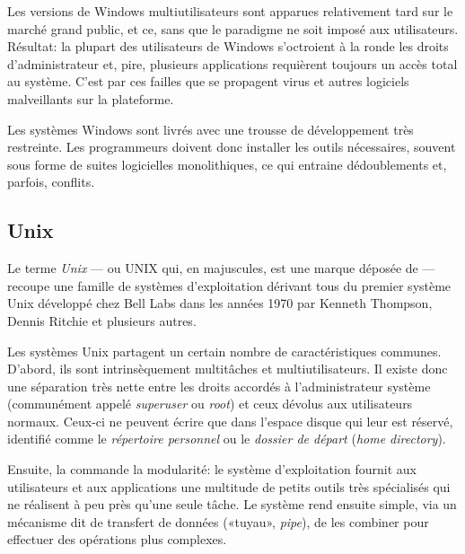 Les versions de Windows multiutilisateurs sont apparues relativement
tard sur le marché grand public, et ce, sans que le paradigme ne soit
imposé aux utilisateurs. Résultat: la plupart des utilisateurs de
Windows s'octroient à la ronde les droits d'administrateur et, pire,
plusieurs applications requièrent toujours un accès total au système.
C'est par ces failles que se propagent virus et autres logiciels
malveillants sur la plateforme.

Les systèmes Windows sont livrés avec une trousse de développement
très restreinte. Les programmeurs doivent donc installer les outils
nécessaires, souvent sous forme de suites logicielles monolithiques,
ce qui entraine dédoublements et, parfois, conflits.

\subsection{Unix}
\label{sec:informatique:os:unix}

Le terme \emph{Unix} --- ou UNIX qui, en majuscules, est
une marque déposée de 
--- recoupe une famille de systèmes d'exploitation dérivant tous du
premier système Unix développé chez Bell Labs dans les années 1970 par
Kenneth Thompson, Dennis Ritchie et plusieurs autres.

Les systèmes Unix partagent un certain nombre de caractéristiques
communes. D'abord, ils sont intrinsèquement multitâches et
multiutilisateurs. Il existe donc une séparation très nette entre les
droits accordés à l'administrateur système (communément appelé
\emph{superuser} ou \emph{root}) et ceux dévolus aux utilisateurs
normaux. Ceux-ci ne peuvent écrire que dans l'espace disque qui leur
est réservé, identifié comme le \emph{répertoire personnel} ou le \emph{dossier de départ}
(\emph{home directory}).

Ensuite, la
 commande la modularité: le système d'exploitation fournit aux
utilisateurs et aux applications une multitude de petits outils très
spécialisés qui ne réalisent à peu près qu'une seule tâche. Le système
rend ensuite simple, via un mécanisme dit de transfert de données
(«tuyau», \emph{pipe}), de les combiner pour effectuer des opérations
plus complexes.

